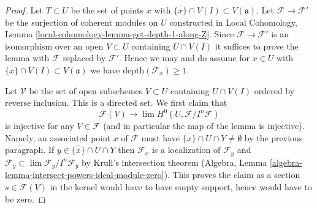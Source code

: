 \documentclass{stacks-project}
\theoremstyle{plain}
\theoremstyle{definition}
\theoremstyle{remark}
\numberwithin{equation}{subsection}
\def\lim{\mathop{\mathrm{lim}}\nolimits}
\begin{document}
\begin{proof}
Let $T \subset U$ be the set of points $x$ with
$\overline{\{x\}} \cap V(I) \subset V(\mathfrak a)$.
Let $\mathcal{F} \to \mathcal{F}'$ be the surjection
of coherent modules on $U$ constructed in
Local Cohomology, Lemma \ref{local-cohomology-lemma-get-depth-1-along-Z}.
Since $\mathcal{F} \to \mathcal{F}'$ is an isomorphism
over an open $V \subset U$ containing $U \cap V(I)$
it suffices to prove the lemma with $\mathcal{F}$ replaced
by $\mathcal{F}'$. Hence we may and do assume
for $x \in U$ with $\overline{\{x\}} \cap V(I) \subset V(\mathfrak a)$
we have $\text{depth}(\mathcal{F}_x) \geq 1$.

\medskip\noindent
Let $\mathcal{V}$ be the set of open subschemes $V \subset U$
containing $U \cap V(I)$ ordered by reverse inclusion.
This is a directed set. We first claim that
$$
\mathcal{F}(V)
\longrightarrow
\lim H^0(U, \mathcal{F}/I^n\mathcal{F})
$$
is injective for any $V \in \mathcal{F}$ (and in particular the map
of the lemma is injective). Namely, an associated point $x$ of $\mathcal{F}$
must have $\overline{\{x\}} \cap U \cap Y \not = \emptyset$
by the previous paragraph. If $y \in \overline{\{x\}} \cap U \cap Y$ then
$\mathcal{F}_x$ is a localization of $\mathcal{F}_y$
and $\mathcal{F}_y \subset \lim \mathcal{F}_y/I^n \mathcal{F}_y$
by Krull's intersection theorem
(Algebra, Lemma \ref{algebra-lemma-intersect-powers-ideal-module-zero}).
This proves the claim as a section $s \in \mathcal{F}(V)$
in the kernel would have to have empty support, hence would have to be zero.


\end{proof}
\end{document}
